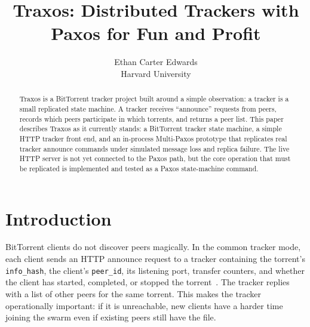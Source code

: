 \documentclass[letterpaper,twocolumn,10pt]{article}
\begin{document}

\date{}

\title{\Large \bf Traxos: Distributed Trackers with Paxos for Fun and Profit}

\author{
{\rm Ethan Carter Edwards}\\
Harvard University}

\maketitle

\begin{abstract}
Traxos is a BitTorrent tracker project built around a simple observation:
a tracker is a small replicated state machine. A tracker receives
``announce'' requests from peers, records which peers participate in which
torrents, and returns a peer list. This paper describes Traxos as it
currently stands: a BitTorrent tracker state machine, a simple HTTP tracker
front end, and an in-process Multi-Paxos prototype that replicates real
tracker announce commands under simulated message loss and replica failure.
The live HTTP server is not yet connected to the Paxos path, but the core
operation that must be replicated is implemented and tested as a Paxos
state-machine command.
\end{abstract}

\section{Introduction}

BitTorrent clients do not discover peers magically. In the common tracker
mode, each client sends an HTTP announce request to a tracker containing the
torrent's \texttt{info\_hash}, the client's \texttt{peer\_id}, its listening
port, transfer counters, and whether the client has started, completed, or
stopped the torrent~\cite{trackerProtocol}. The tracker replies with a list
of other peers for the same torrent. This makes the tracker operationally
important: if it is unreachable, new clients have a harder time joining the
swarm even if existing peers still have the file.
\end{document}
